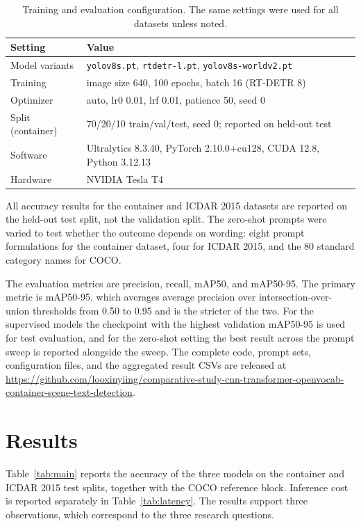 \documentclass[conference]{IEEEtran}
\begin{document}
\begin{table}[tb]
\centering
\caption{Training and evaluation configuration. The same settings were used for all datasets unless noted.}
\label{tab:config}
\begin{tabular}{ll}
\toprule
Setting & Value \\
\midrule
Model variants & \texttt{yolov8s.pt}, \texttt{rtdetr-l.pt}, \texttt{yolov8s-worldv2.pt} \\
Training & image size 640, 100 epochs, batch 16 (RT-DETR 8) \\
Optimizer & auto, lr0 0.01, lrf 0.01, patience 50, seed 0 \\
Split (container) & 70/20/10 train/val/test, seed 0; reported on held-out test \\
Software & Ultralytics 8.3.40, PyTorch 2.10.0+cu128, CUDA 12.8, Python 3.12.13 \\
Hardware & NVIDIA Tesla T4 \\
\bottomrule
\end{tabular}
\end{table}

All accuracy results for the container and ICDAR 2015 datasets are reported on the held-out test split, not the validation split. The zero-shot prompts were varied to test whether the outcome depends on wording: eight prompt formulations for the container dataset, four for ICDAR 2015, and the 80 standard category names for COCO.

The evaluation metrics are precision, recall, mAP50, and mAP50-95. The primary metric is mAP50-95, which averages average precision over intersection-over-union thresholds from 0.50 to 0.95 and is the stricter of the two. For the supervised models the checkpoint with the highest validation mAP50-95 is used for test evaluation, and for the zero-shot setting the best result across the prompt sweep is reported alongside the sweep. The complete code, prompt sets, configuration files, and the aggregated result CSVs are released at \url{https://github.com/looxinyiing/comparative-study-cnn-transformer-openvocab-container-scene-text-detection}.

\section{Results}

Table~\ref{tab:main} reports the accuracy of the three models on the container and ICDAR 2015 test splits, together with the COCO reference block. Inference cost is reported separately in Table~\ref{tab:latency}. The results support three observations, which correspond to the three research questions.
\end{document}
